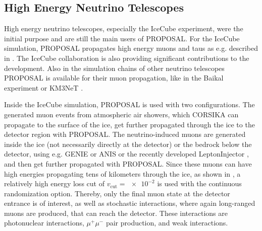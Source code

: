 %

\subsection{High Energy Neutrino Telescopes}

High energy neutrino telescopes, especially the IceCube experiment, were the initial purpose and are still the main users of PROPOSAL.
For the IceCube simulation, PROPOSAL propagates high energy muons and taus as e.g. described in \cite{IceCube2016Aachen}.
The IceCube collaboration is also providing significant contributions to the development.
Also in the simulation chains of other neutrino telescopes PROPOSAL is available for their muon propagation, like in the Baikal experiment \cite{Pastircak19Baikal} or KM3NeT \cite{Km3Net2020gSeaGen}.

Inside the IceCube simulation, PROPOSAL is used with two configurations.
The generated muon events from atmospheric air showers, which CORSIKA can propagate to the surface of the ice, get further propagated through the ice to the detector region with PROPOSAL.
The neutrino-induced muons are generated inside the ice (not necessarily directly at the detector) or the bedrock below the detector, using e.g. GENIE \cite{Andreopoulos10genie} or ANIS \cite{Gazizov05anis} or the recently developed LeptonInjector \cite{Icecube21LeptinInjector}, and then get further propagated with PROPOSAL.
Since these muons can have high energies propagating tens of kilometers through the ice, as shown in , a relatively high energy loss cut of $v_{\mathrm{cut}} = \num{e-2}$ is used with the continuous randomization option.
Thereby, only the final muon state at the detector entrance is of interest, as well as stochastic interactions, where again long-ranged muons are produced, that can reach the detector.
These interactions are photonuclear interactions, $\mu^+\mu^-$ pair production, and weak interactions.

